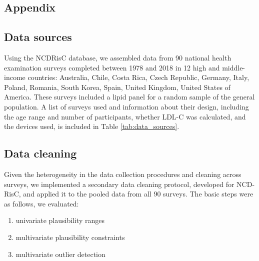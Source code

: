 \documentclass[12pt]{article}
\begin{document}
\begin{appendix}
    \renewcommand{\thefigure}{A\arabic{figure}}
    \setcounter{figure}{0}
    
    \renewcommand{\thetable}{A\arabic{table}}
    \setcounter{table}{0}
    
    \newpage
    
    \section{Appendix} \label{sec:appendixa}
    \renewcommand{\thesection}{\Alph{section}}

    \subsection{Data sources}
    Using the NCDRisC database, we assembled data from 90 national health examination surveys completed between 1978 and 2018 in 12 high and middle-income countries: Australia, Chile, Costa Rica, Czech Republic, Germany, Italy, Poland, Romania, South Korea, Spain, United Kingdom, United States of America. These surveys included a lipid panel for a random sample of the general population. A list of surveys used and information about their design, including the age range and number of participants, whether LDL-C was calculated, and the devices used, is included in Table \ref{tab:data_sources}.
    
    \begin{landscape}
    \begin{singlespace}
        
        \label{tab:data_sources}
    \end{singlespace}
    \end{landscape}


    \subsection{Data cleaning}
    Given the heterogeneity in the data collection procedures and cleaning across surveys, we implemented a secondary data cleaning protocol, developed for NCD-RisC, and applied it to the pooled data from all 90 surveys. The basic steps were as follows, we evaluated:
    \begin{enumerate}
        \item univariate plausibility ranges
        \item multivariate plausibility constraints
        \item multivariate outlier detection
    \end{enumerate}


\end{appendix}
\end{document}
